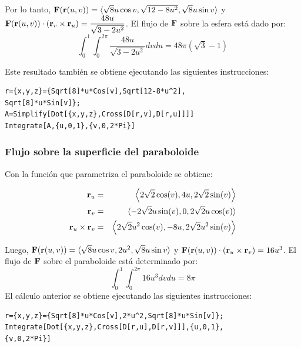 \begin{parrafonumerado}
Por lo tanto, ${\bf F}({\bf r}(u,v)) = \langle \sqrt{8}u \cos v ,\sqrt{12-8u^2} ,\sqrt{8}u\sin v \rangle$ y
${\bf F}({\bf r}(u,v))\cdot({\bf r}_v \times {\bf r}_u)=\dfrac{48u}{\sqrt{3-2u^2}}$.
El flujo de ${\bf F}$ sobre la esfera está dado por:
\begin{equation}\label{flujo12}
\int_0^1\int_0^{2\pi}\frac{48u}{\sqrt{3-2u^2}} dvdu= 48\pi (\sqrt{3}-1)
\end{equation}

Este resultado también se obtiene ejecutando  las siguientes instrucciones:

\begin{tcolorbox}[title=\bf Instrucción \verb"Mathematica"]\begin{Verbatim}[formatcom=\letraverbatim]
r={x,y,z}={Sqrt[8]*u*Cos[v],Sqrt[12-8*u^2],
Sqrt[8]*u*Sin[v]};
A=Simplify[Dot[{x,y,z},Cross[D[r,v],D[r,u]]]]
Integrate[A,{u,0,1},{v,0,2*Pi}]
\end{Verbatim}
\end{tcolorbox}

\subsubsection{Flujo sobre la superficie del paraboloide}

Con la función que parametriza el paraboloide se obtiene:

\begin{eqnarray*}
{\bf r}_u &=& \left \langle 2 \sqrt{2}\cos(v), 4u,2\sqrt{2}\sin(v) \right \rangle \\
{\bf r}_v &=&\langle -2\sqrt{2}u\sin(v),0,2\sqrt{2}u\cos(v) \rangle \\
{\bf r}_u \times {\bf r}_v &=& \left \langle 2\sqrt{2}u^2 \cos(v),-8u,2\sqrt{2}u^2 \sin(v) \right\rangle
\end{eqnarray*}

Luego, ${\bf F}({\bf r}(u,v)) = \langle \sqrt{8}u \cos v ,2u^2 ,\sqrt{8}u\sin v \rangle$ y
${\bf F}({\bf r}(u,v))\cdot({\bf r}_u \times {\bf r}_v)=16u^3 $.
El flujo de ${\bf F}$ sobre el paraboloide está determinado por:
\begin{equation}\label{flujo11}
\int_0^1\int_0^{2\pi } 16 u^3 dvdu= 8\pi
\end{equation}
El cálculo anterior se obtiene ejecutando las siguientes instrucciones:

\begin{tcolorbox}[title=\bf Instrucción \verb"Mathematica"]\begin{Verbatim}[formatcom=\letraverbatim]
r={x,y,z}={Sqrt[8]*u*Cos[v],2*u^2,Sqrt[8]*u*Sin[v]};
Integrate[Dot[{x,y,z},Cross[D[r,u],D[r,v]]],{u,0,1},
{v,0,2*Pi}]
\end{Verbatim}
\end{tcolorbox}


\end{parrafonumerado}

